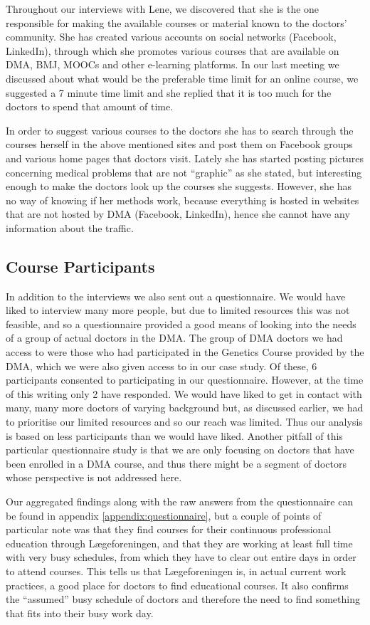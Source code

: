 Throughout our interviews with Lene, we discovered that she is the one responsible for making the available courses or material known to the doctors’ community. She has created various accounts on social networks (Facebook, LinkedIn), through which she promotes various courses that are available on DMA, BMJ, MOOCs and other e-learning platforms. In our last meeting we discussed about what would be the preferable time limit for an online course, we suggested a 7 minute time limit  and she replied that it is too much for the doctors to spend that amount of time.

In order to suggest various courses to the doctors she has to search through the courses herself in the above mentioned sites and post them on Facebook groups and various home pages that doctors visit. Lately she has started posting pictures concerning medical problems that are not “graphic” as she stated, but interesting enough to make the doctors look up the courses she suggests. However, she has no way of knowing if her methods work, because everything is hosted in websites that are not hosted by DMA (Facebook, LinkedIn), hence she cannot have any information about the traffic.

\subsection{Course Participants}
\label{indepth:questionnaire}
In addition to the interviews we also sent out a questionnaire. We would have liked to interview many more people, but due to limited resources this was not feasible, and so a questionnaire provided a good means of looking into the needs of a group of actual doctors in the DMA. The group of DMA doctors we had access to were those who had participated in the Genetics Course provided by the DMA, which we were also given access to in our case study. Of these, 6 participants consented to participating in our questionnaire. However, at the time of this writing only 2 have responded. We would have liked to get in contact with many, many more doctors of varying background but, as discussed earlier, we had to prioritise our limited resources and so our reach was limited. Thus our analysis is based on less participants than we would have liked. Another pitfall of this particular questionnaire study is that we are only focusing on doctors that have been enrolled in a DMA course, and thus there might be a segment of doctors whose perspective is not addressed here.

Our aggregated findings along with the raw answers from the questionnaire can be found in appendix \ref{appendix:questionnaire}, but a couple of points of particular note was that they find courses for their continuous professional education through Lægeforeningen, and that they are working at least full time with very busy schedules, from which they have to clear out entire days in order to attend courses. This tells us that Lægeforeningen is, in actual current work practices, a good place for doctors to find educational courses. It also confirms the “assumed” busy schedule of doctors and therefore the need to find something that fits into their busy work day.

